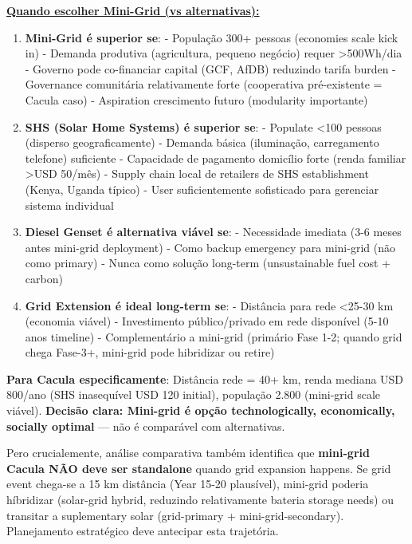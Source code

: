 \documentclass[12pt, a4paper]{article}
\begin{document}
\underline{\textbf{Quando escolher Mini-Grid (vs alternativas):}}
\begin{enumerate}
\item \textbf{Mini-Grid é superior se}:
   - População 300+ pessoas (economies scale kick in)
   - Demanda produtiva (agricultura, pequeno negócio) requer >500Wh/dia
   - Governo pode co-financiar capital (GCF, AfDB) reduzindo tarifa burden
   - Governance comunitária relativamente forte (cooperativa pré-existente = Cacula caso)
   - Aspiration crescimento futuro (modularity importante)

\item \textbf{SHS (Solar Home Systems) é superior se}:
   - Populate <100 pessoas (disperso geograficamente)
   - Demanda básica (iluminação, carregamento telefone) suficiente
   - Capacidade de pagamento domicílio forte (renda familiar >USD 50/mês)
   - Supply chain local de retailers de SHS establishment (Kenya, Uganda típico)
   - User suficientemente sofisticado para gerenciar sistema individual

\item \textbf{Diesel Genset é alternativa viável se}:
   - Necessidade imediata (3-6 meses antes mini-grid deployment)
   - Como backup emergency para mini-grid (não como primary)
   - Nunca como solução long-term (unsustainable fuel cost + carbon)

\item \textbf{Grid Extension é ideal long-term se}:
   - Distância para rede <25-30 km (economia viável)
   - Investimento público/privado em rede disponível (5-10 anos timeline)
   - Complementário a mini-grid (primário Fase 1-2; quando grid chega Fase-3+, mini-grid pode hibridizar ou retire)

\end{enumerate}

\textbf{Para Cacula especificamente}: Distância rede = 40+ km, renda mediana USD 800/ano (SHS inasequível USD 120 initial), população 2.800 (mini-grid scale viável). \textbf{Decisão clara: Mini-grid é opção technologically, economically, socially optimal} — não é comparável com alternativas.

Pero crucialemente, análise comparativa também identifica que \textbf{mini-grid Cacula NÃO deve ser standalone} quando grid expansion happens. Se grid event chega-se a 15 km distância (Year 15-20 plausível), mini-grid poderia híbridizar (solar-grid hybrid, reduzindo relativamente bateria storage needs) ou transitar a suplementary solar (grid-primary + mini-grid-secondary). Planejamento estratégico deve antecipar esta trajetória.
\end{document}
